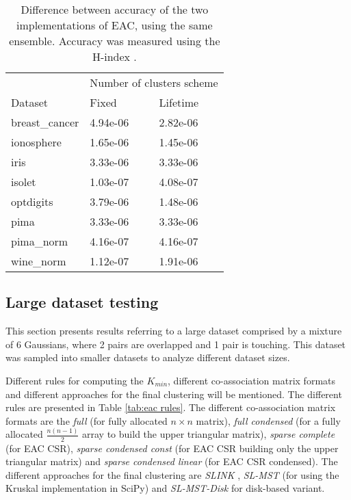 \begin{table}[h]
\centering
\caption{Difference between accuracy of the two implementations of EAC, using the same ensemble. Accuracy was measured using the H-index \cite{Meila2003}.}

\begin{tabular}{lll}
\toprule
         &        \multicolumn{2}{c}{Number of clusters scheme} \\
Dataset &      Fixed & Lifetime \\
\midrule
breast\_cancer &  4.94e-06 &     2.82e-06 \\
ionosphere     &  1.65e-06 &     1.45e-06 \\
iris           &  3.33e-06 &     3.33e-06 \\
isolet         &  1.03e-07 &     4.08e-07 \\
optdigits      &  3.79e-06 &     1.48e-06 \\
pima           &  3.33e-06 &     3.33e-06 \\
pima\_norm     &  4.16e-07 &     4.16e-07 \\
wine\_norm     &  1.12e-07 &     1.91e-06 \\
\bottomrule
\end{tabular}

\label{tab:validation error acc}
\end{table}

\subsection{Large dataset testing}

\noindent This section presents results referring to a large dataset comprised by a mixture of 6 Gaussians, where 2 pairs are overlapped and 1 pair is touching.
This dataset was sampled into smaller datasets to analyze different dataset sizes.

Different rules for computing the $K_{min}$, different co-association matrix formats and different approaches for the final clustering will be mentioned.
The different rules are presented in Table \ref{tab:eac rules}.
The different co-association matrix formats are the \emph{full} (for fully allocated $n \times n$ matrix), \emph{full condensed} (for a fully allocated $\frac{n(n-1)}{2}$ array to build the upper triangular matrix), \emph{sparse complete} (for EAC CSR), \emph{sparse condensed const} (for EAC CSR building only the upper triangular matrix) and \emph{sparse condensed linear} (for EAC CSR condensed).
The different approaches for the final clustering are \emph{SLINK} \cite{Sibson1973}, \emph{SL-MST} (for using the Kruskal implementation in SciPy) and \emph{SL-MST-Disk} for disk-based variant.

